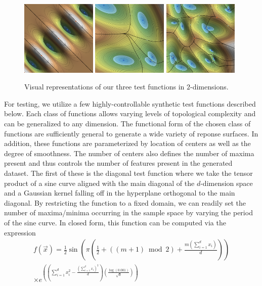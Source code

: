 \begin{figure}[htbp]
    \includegraphics[width=0.32\textwidth]{figs/chap7/diag4.png}
    \includegraphics[width=0.32\textwidth]{figs/chap7/df5.png}
    \includegraphics[width=0.32\textwidth]{figs/chap7/df15.png}
    \caption{Visual representations of our three test functions in $2$-dimensions.}
    \label{fig:datasets}
\end{figure}

For testing, we utilize a few highly-controllable synthetic test functions described below.
%
Each class of functions allows varying levels of topological complexity and can be generalized to any dimension.
%
The functional form of the chosen class of functions are sufficiently general to generate a wide variety of reponse surfaces.
%
In addition, these functions are parameterized by location of centers as well as the degree of smoothness.
%
The number of centers also defines the number of maxima present and thus controls the number of features present in the generated dataset.
%
The first of these is the diagonal test function where we take the tensor product of a sine curve aligned with the main diagonal of the $d$-dimension space and a Gaussian kernel falling off in the hyperplane orthogonal to the main diagonal.
%
By restricting the function to a fixed domain, we can readily set the number of maxima/minima occurring in the sample space by varying the period of the sine curve.
%
In closed form, this function can be computed via the expression
\begin{eqnarray*}
    f(\vec{x}) = \frac{1}{2}\sin\left(\pi\left(\frac{1}{2} + \left((m+1)
      \bmod{2}\right) + \frac{m\left(\sum_{i=1}^{d}x_i\right)}{d}\right)\right)
    \\
     \times e^{\left(\left(\sum_{i=1}^{d}x_i^2 -\frac{\left(\sum_{i=1}^{d}
      x_i\right)^2}{d}\right)\left(\frac{\log(0.001)}{\sqrt{d}}\right)\right)}
\end{eqnarray*}

